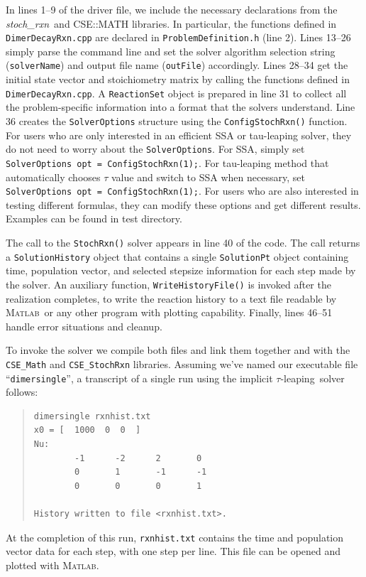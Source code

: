 \documentclass[12pt]{article}
\newcommand{\stochrxn}{\emph{stoch\_\-rxn}}
\newcommand{\tauleaping}{$\tau$-leap\-ing}
\newcommand{\matlab}{\textsc{Matlab}}
\newcommand{\api}[1]{\texttt{#1}}
\newcommand{\srccode}[1]{\texttt{#1}}
\newenvironment{code}{\begin{quote}\singlespacing}{\end{quote}}
\begin{document}
In lines 1--9 of the driver file, we include the necessary
declarations from the \stochrxn\ and CSE::MATH libraries.  In
particular, the functions defined in \api{DimerDecayRxn.cpp} are
declared in \api{ProblemDefinition.h} (line 2).  Lines 13--26 simply
parse the command line and set the
solver algorithm selection string (\api{solverName}) and output file
name (\api{outFile}) accordingly.  Lines 28--34 get the initial state
vector and stoichiometry matrix by calling the functions defined in
\api{DimerDecayRxn.cpp}.  A \api{ReactionSet} object is prepared in
line 31 to collect all the problem-specific information into a format
that the solvers understand.  Line 36 creates the \api{SolverOptions}
structure using the \api{ConfigStochRxn()} function. For users who are
only interested in an efficient SSA or tau-leaping solver, they do not
need to worry about the \api{SolverOptions}. For SSA, simply set
\api{SolverOptions opt = ConfigStochRxn(1);}. For tau-leaping method 
that automatically chooses $\tau$ value and switch to SSA when necessary, 
set \api{SolverOptions opt = ConfigStochRxn(1);}. For users who are
also interested in testing different formulas, they can modify these
options and get different results. Examples can be found in test 
directory. 

The call to the \api{StochRxn()} solver appears in line 40 of the
code.  The call returns a \api{SolutionHistory} object that contains a
single \api{SolutionPt} object containing time, population vector, and
selected stepsize information for each step made by the solver.  An
auxiliary function, \api{WriteHistoryFile()} is invoked after the
realization completes, to write the reaction history to a text file
readable by \matlab\ or any other program with plotting capability.
Finally, lines 46--51 handle error situations and cleanup.

To invoke the solver we compile both files and link them together and
with the \api{CSE\_Math} and \api{CSE\_StochRxn} libraries.  Assuming
we've named our executable file ``\srccode{dimersingle}'', a transcript of a
single run using the implicit \tauleaping\ solver follows:
\begin{code}
\begin{verbatim} 
dimersingle rxnhist.txt
x0 = [  1000  0  0  ]
Nu:
        -1      -2      2       0
        0       1       -1      -1
        0       0       0       1

History written to file <rxnhist.txt>.
\end{verbatim}
\end{code}
At the completion of this run, \api{rxnhist.txt} contains the time and
population vector data for each step, with one step per line.  This
file can be opened and plotted with \matlab.
\end{document}
